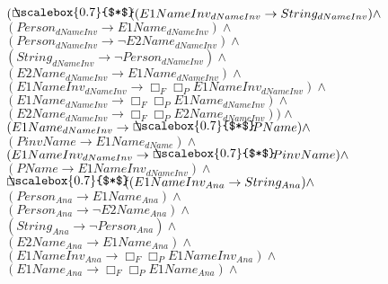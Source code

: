 \documentclass[a4paper,10pt]{article}
\begin{document}
 \newcommand{\nxt}{{\ensuremath\raisebox{0.25ex}{\text{\scriptsize$\bigcirc$}}}}
\newcommand{\Rdiamond}{\Diamond_{\!F}}
\newcommand{\Rbox}{\Box_{\!F}}
\newcommand{\Rnext}{\nxt_{\!F}}
\newcommand{\Ldiamond}{\Diamond_{\!P}}
\newcommand{\Lbox}{\Box_{\!P}}
\newcommand{\Lnext}{\nxt_{\!P}}
\newcommand{\SVdiamond}{\mathop{\ooalign{$\Diamond$ \cr \kern0.5ex
    \raisebox{0.35ex}{\scalebox{0.7}{$*$}}} \kern-0.9ex}}
\newcommand{\SVbox}{\mathop{\ooalign{$\Box$ \cr \kern0.42ex
    \raisebox{0.3ex}{\scalebox{0.7}{$*$}}} \kern-0.9ex}}


$( \SVbox ((E1NameInv_{dNameInv} \rightarrow String_{dNameInv}) \land $ \\ 
 $ (Person_{dNameInv} \rightarrow E1Name_{dNameInv}) \land $ \\ 
 $ (Person_{dNameInv} \rightarrow  \lnot E2Name_{dNameInv}) \land $ \\ 
 $ (String_{dNameInv} \rightarrow  \lnot Person_{dNameInv}) \land $ \\ 
 $ (E2Name_{dNameInv} \rightarrow E1Name_{dNameInv}) \land $ \\ 
 $ (E1NameInv_{dNameInv} \rightarrow  \Rbox  \Lbox E1NameInv_{dNameInv}) \land $ \\ 
 $ (E1Name_{dNameInv} \rightarrow  \Rbox  \Lbox E1Name_{dNameInv}) \land $ \\ 
 $ (E2Name_{dNameInv} \rightarrow  \Rbox  \Lbox E2Name_{dNameInv})) \land $ \\ 
 $ (E1Name_{dNameInv} \rightarrow  \SVbox PName) \land $ \\ 
 $ (PinvName \rightarrow E1Name_{dName}) \land $ \\ 
 $ (E1NameInv_{dNameInv} \rightarrow  \SVbox PinvName) \land $ \\ 
 $ (PName \rightarrow E1NameInv_{dNameInv}) \land $ \\ 
 $  \SVbox ((E1NameInv_{Ana} \rightarrow String_{Ana}) \land $ \\ 
 $ (Person_{Ana} \rightarrow E1Name_{Ana}) \land $ \\ 
 $ (Person_{Ana} \rightarrow  \lnot E2Name_{Ana}) \land $ \\ 
 $ (String_{Ana} \rightarrow  \lnot Person_{Ana}) \land $ \\ 
 $ (E2Name_{Ana} \rightarrow E1Name_{Ana}) \land $ \\ 
 $ (E1NameInv_{Ana} \rightarrow  \Rbox  \Lbox E1NameInv_{Ana}) \land $ \\ 
 $ (E1Name_{Ana} \rightarrow  \Rbox  \Lbox E1Name_{Ana}) \land $ \\ 
\end{document}
